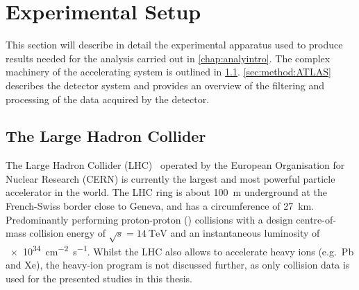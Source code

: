 \chapter{Experimental Setup}\label{chap:expSetup}
This section will describe in detail the experimental apparatus used to produce results needed for the analysis carried out in \cref{chap:analyintro}. The complex machinery of the accelerating system is outlined in \cref{sec:method:LHC}. \cref{sec:method:ATLAS} describes the detector system and provides an overview of the filtering and processing of the data acquired by the detector.

\section{The Large Hadron Collider}\label{sec:method:LHC}
The Large Hadron Collider (LHC)~\cite{LHC} operated by the European Organisation for Nuclear Research (CERN) is currently the largest and most powerful particle accelerator in the world. The LHC ring is about \SI{100}{\metre} underground at the French-Swiss border close to Geneva, and has a circumference of \SI{27}{\kilo\metre}. Predominantly performing proton-proton (\protonproton) collisions with a design centre-of-mass collision energy of $\sqrt{s} = \SI{14}{\tera\electronvolt}$ and an instantaneous luminosity of \SI{e34}{\centi\metre^{-2} \second^{-1}}. Whilst the LHC also allows to accelerate heavy ions (e.g.\ Pb and Xe), the heavy-ion program is not discussed further, as only \protonproton collision data is used for the presented studies in this thesis. 

